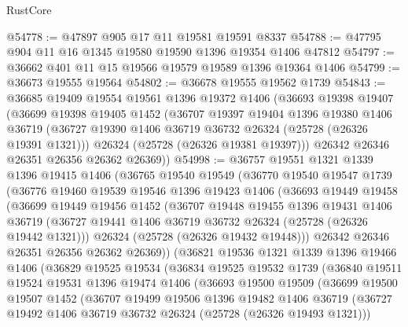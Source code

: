\begin{lexlean}{RustCore}
\begin{coremodule}
@54778 := @47897 @905 @17 @11 @19581 @19591 @8337
@54788 := @47795 @904 @11 @16 @1345 @19580 @19590 @1396 @19354 @1406 @47812
@54797 := @36662 @401 @11 @15 @19566 @19579 @19589 @1396 @19364 @1406
@54799 := @36673 @19555 @19564
@54802 := @36678 @19555 @19562 @1739
@54843 := @36685
    @19409
    @19554
    @19561
    @1396
    @19372
    @1406
    (@36693
      @19398
      @19407
      (@36699
        @19398
        @19405
        @1452
        (@36707
          @19397
          @19404
          @1396
          @19380
          @1406
          @36719
          (@36727 @19390 @1406 @36719 @36732 @26324 (@25728 (@26326 @19391 @1321)))
          @26324
          (@25728 (@26326 @19381 @19397)))
        @26342
        @26346
        @26351
        @26356
        @26362
        @26369))
@54998 := @36757
    @19551
    @1321
    @1339
    @1396
    @19415
    @1406
    (@36765
      @19540
      @19549
      (@36770
        @19540
        @19547
        @1739
        (@36776
          @19460
          @19539
          @19546
          @1396
          @19423
          @1406
          (@36693
            @19449
            @19458
            (@36699
              @19449
              @19456
              @1452
              (@36707
                @19448
                @19455
                @1396
                @19431
                @1406
                @36719
                (@36727 @19441 @1406 @36719 @36732 @26324 (@25728 (@26326 @19442 @1321)))
                @26324
                (@25728 (@26326 @19432 @19448)))
              @26342
              @26346
              @26351
              @26356
              @26362
              @26369))
          (@36821
            @19536
            @1321
            @1339
            @1396
            @19466
            @1406
            (@36829
              @19525
              @19534
              (@36834
                @19525
                @19532
                @1739
                (@36840
                  @19511
                  @19524
                  @19531
                  @1396
                  @19474
                  @1406
                  (@36693
                    @19500
                    @19509
                    (@36699
                      @19500
                      @19507
                      @1452
                      (@36707
                        @19499
                        @19506
                        @1396
                        @19482
                        @1406
                        @36719
                        (@36727 @19492 @1406 @36719 @36732 @26324 (@25728 (@26326 @19493 @1321)))

\end{coremodule}
\end{lexlean}
